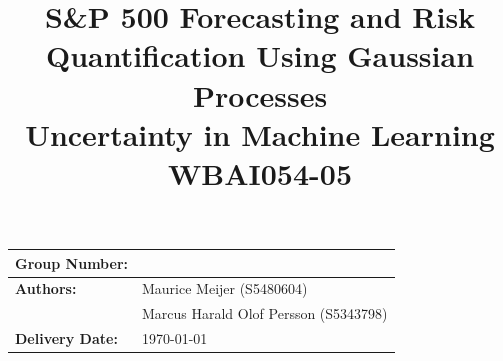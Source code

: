 
\usepackage{float}
\usepackage{url}
\usepackage{amssymb}
\usepackage[style=apa]{biblatex}

\usepackage[colorlinks=false]{hyperref}


\pagestyle{body}

\title{
    \vspace{5cm}
        {\bf
        {\Huge S\&P 500 Forecasting and Risk Quantification Using Gaussian Processes}} \\
    \vspace{1cm}
        {\bf
        {\Large Uncertainty in Machine Learning}} \\
        {\large WBAI054-05}
}
\date{}

\maketitle
\thispagestyle{titlepage}

\vfill

\begin{table}[h]
    \centering
    \begin{tabular}{| >{\raggedright\arraybackslash}p{4cm} | >{\raggedright\arraybackslash}p{10cm} |}
    \hline
    \textbf{Group Number:}          & 10 \\ \hline
    \textbf{Authors:}               & Maurice Meijer (S5480604) \\ 
                                    & Marcus Harald Olof Persson (S5343798) \\ \hline
    \textbf{Delivery Date:}         & \today \\ \hline
    
    \end{tabular}
\end{table}

\newpage

\tableofcontents

\newpage









\newpage

\pagestyle{references}
\printbibliography

\newpage

\appendix
\pagestyle{appendix}



